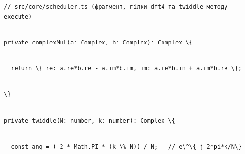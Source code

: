 \documentclass[
]{article}
\newcommand{\passthrough}[1]{#1}
\begin{document}
\passthrough{\lstinline!//!}\passthrough{\lstinline! !}\passthrough{\lstinline!src!}\passthrough{\lstinline!/core/!}\passthrough{\lstinline!scheduler.ts!}\passthrough{\lstinline! !}\passthrough{\lstinline!(!}\passthrough{\lstinline!фрагмент!}\passthrough{\lstinline!,!}\passthrough{\lstinline! !}\passthrough{\lstinline!гілки!}\passthrough{\lstinline! !}\passthrough{\lstinline!dft4!}\passthrough{\lstinline! !}\passthrough{\lstinline!та!}\passthrough{\lstinline! !}\passthrough{\lstinline!twiddle!}\passthrough{\lstinline! !}\passthrough{\lstinline!методу!}\passthrough{\lstinline! !}\passthrough{\lstinline!execute)!}\strut \\
\passthrough{\lstinline!private!}\passthrough{\lstinline! !}\passthrough{\lstinline!complexMul!}\passthrough{\lstinline!(a:!}\passthrough{\lstinline! !}\passthrough{\lstinline!Complex,!}\passthrough{\lstinline! !}\passthrough{\lstinline!b:!}\passthrough{\lstinline! !}\passthrough{\lstinline!Complex):!}\passthrough{\lstinline! !}\passthrough{\lstinline!Complex!}\passthrough{\lstinline! !}\passthrough{\lstinline!\{!}\strut \\
\passthrough{\lstinline!  !}\passthrough{\lstinline!return!}\passthrough{\lstinline! !}\passthrough{\lstinline!\{!}\passthrough{\lstinline! !}\passthrough{\lstinline!re:!}\passthrough{\lstinline! !}\passthrough{\lstinline!a.re*b.re!}\passthrough{\lstinline! !}\passthrough{\lstinline!-!}\passthrough{\lstinline! !}\passthrough{\lstinline!a.im*b.im,!}\passthrough{\lstinline! !}\passthrough{\lstinline!im:!}\passthrough{\lstinline! !}\passthrough{\lstinline!a.re*b.im!}\passthrough{\lstinline! !}\passthrough{\lstinline!+!}\passthrough{\lstinline! !}\passthrough{\lstinline!a.im*b.re!}\passthrough{\lstinline! !}\passthrough{\lstinline!\};!}\strut \\
\passthrough{\lstinline!\}!}\strut \\
\passthrough{\lstinline!private!}\passthrough{\lstinline! !}\passthrough{\lstinline!twiddle(N:!}\passthrough{\lstinline! !}\passthrough{\lstinline!number,!}\passthrough{\lstinline! !}\passthrough{\lstinline!k:!}\passthrough{\lstinline! !}\passthrough{\lstinline!number):!}\passthrough{\lstinline! !}\passthrough{\lstinline!Complex!}\passthrough{\lstinline! !}\passthrough{\lstinline!\{!}\strut \\
\passthrough{\lstinline!  !}\passthrough{\lstinline!const!}\passthrough{\lstinline! !}\passthrough{\lstinline!ang!}\passthrough{\lstinline! !}\passthrough{\lstinline!=!}\passthrough{\lstinline! !}\passthrough{\lstinline!(-2!}\passthrough{\lstinline! !}\passthrough{\lstinline!*!}\passthrough{\lstinline! !}\passthrough{\lstinline!Math.PI!}\passthrough{\lstinline! !}\passthrough{\lstinline!*!}\passthrough{\lstinline! !}\passthrough{\lstinline!(k!}\passthrough{\lstinline! !}\passthrough{\lstinline!\%!}\passthrough{\lstinline! !}\passthrough{\lstinline!N))!}\passthrough{\lstinline! !}\passthrough{\lstinline!/!}\passthrough{\lstinline! !}\passthrough{\lstinline!N;!}\passthrough{\lstinline!   !}\passthrough{\lstinline!//!}\passthrough{\lstinline! !}\passthrough{\lstinline!e\^\{-j!}\passthrough{\lstinline! !}\passthrough{\lstinline!2*pi*k/N\}!}\strut \\
\end{document}
